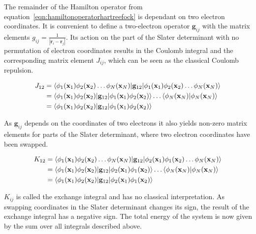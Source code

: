 The remainder of the Hamilton operator from
equation~\eqref{eqn:hamiltonoperatorhartreefock} is dependant on two electron
coordinates. It is convenient to define a two-electron operator $\mathbf{g}_{ij}$
with the matrix elements $g_{ij}=\frac{1}{|\mathbf{r}_i-\mathbf{r}_j|}$. Its
action on the part of the Slater determinant with no permutation of electron
coordinates results in the Coulomb integral and the corresponding matrix
element $J_{ij}$, which can be seen as the classical Coulomb repulsion.

\begin{align}
    \begin{aligned}
        J_{12}&=\braket{\phi_1(\mathbf{x}_1)\phi_2(\mathbf{x}_2)\ldots\phi_N(\mathbf{x}_N)|\mathbf{g}_{12}|\phi_1(\mathbf{x}_1)\phi_2(\mathbf{x}_2)\ldots\phi_N(\mathbf{x}_N)}\\
        &=\braket{\phi_1(\mathbf{x}_1)\phi_2(\mathbf{x}_2)|\mathbf{g}_{12}|\phi_1(\mathbf{x}_1)\phi_2(\mathbf{x}_2)}\ldots\braket{\phi_N(\mathbf{x}_N)|\phi_N(\mathbf{x}_N)} \\
        &=\braket{\phi_1(\mathbf{x}_1)\phi_2(\mathbf{x}_2)|\mathbf{g}_{12}|\phi_1(\mathbf{x}_1)\phi_2(\mathbf{x}_2)}
    \end{aligned}
\end{align}

As $\mathbf{g}_{ij}$ depends on the coordinates of two electrons it also yields
non-zero matrix elements for parts of the Slater determinant, where two
electron coordinates have been swapped.

\begin{align}
    \begin{aligned}
        K_{12}&=\braket{\phi_1(\mathbf{x}_1)\phi_2(\mathbf{x}_2)\ldots\phi_N(\mathbf{x}_N)|\mathbf{g}_{12}|\phi_2(\mathbf{x}_1)\phi_1(\mathbf{x}_2)\ldots\phi_N(\mathbf{x}_N)}\\
        &=\braket{\phi_1(\mathbf{x}_1)\phi_2(\mathbf{x}_2)|\mathbf{g}_{12}|\phi_2(\mathbf{x}_1)\phi_1(\mathbf{x}_2)}\ldots\braket{\phi_N(\mathbf{x}_N)|\phi_N(\mathbf{x}_N)} \\
        &=\braket{\phi_1(\mathbf{x}_1)\phi_2(\mathbf{x}_2)|\mathbf{g}_{12}|\phi_2(\mathbf{x}_1)\phi_1(\mathbf{x}_2)}
    \end{aligned}
\end{align}

$K_{ij}$ is called the exchange integral and has no classical interpretation.
As swapping coordinates in the Slater determinant changes its sign, the result
of the exchange integral has a negative sign. The total energy of the system is
now given by the sum over all integrals described above.

